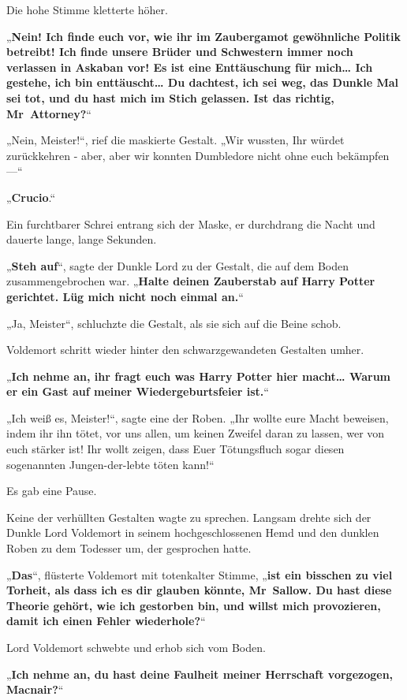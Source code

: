 {Die hohe Stimme kletterte höher.

„\textbf{Nein! Ich finde euch vor, wie ihr im Zaubergamot gewöhnliche Politik betreibt! Ich finde unsere Brüder und Schwestern immer noch verlassen in Askaban vor! Es ist eine Enttäuschung für mich… Ich gestehe, ich bin enttäuscht… Du dachtest, ich sei weg, das Dunkle Mal sei tot, und du hast mich im Stich gelassen. Ist das richtig, Mr~Attorney?}“

„Nein, Meister!“, rief die maskierte Gestalt. „Wir wussten, Ihr würdet zurückkehren - aber, aber wir konnten Dumbledore nicht ohne euch bekämpfen—“

„\textbf{Crucio}.“

Ein furchtbarer Schrei entrang sich der Maske, er durchdrang die Nacht und dauerte lange, lange Sekunden.

„\textbf{Steh auf}“, sagte der Dunkle Lord zu der Gestalt, die auf dem Boden zusammengebrochen war. „\textbf{Halte deinen Zauberstab auf Harry Potter gerichtet. Lüg mich nicht noch einmal an.}“

„Ja, Meister“, schluchzte die Gestalt, als sie sich auf die Beine schob.

Voldemort schritt wieder hinter den schwarzgewandeten Gestalten umher.

„\textbf{Ich nehme an, ihr fragt euch was Harry Potter hier macht… Warum er ein Gast auf meiner Wiedergeburtsfeier ist.}“

„Ich weiß es, Meister!“, sagte eine der Roben. „Ihr wollte eure Macht beweisen, indem ihr ihn tötet, vor uns allen, um keinen Zweifel daran zu lassen, wer von euch stärker ist! Ihr wollt zeigen, dass Euer Tötungsfluch sogar diesen sogenannten Jungen-der-lebte töten kann!“

Es gab eine Pause.

Keine der verhüllten Gestalten wagte zu sprechen. Langsam drehte sich der Dunkle Lord Voldemort in seinem hochgeschlossenen Hemd und den dunklen Roben zu dem Todesser um, der gesprochen hatte.

„\textbf{Das}“, flüsterte Voldemort mit totenkalter Stimme, „\textbf{ist ein bisschen zu viel Torheit, als dass ich es dir glauben könnte, Mr~Sallow. Du hast diese Theorie gehört, wie ich gestorben bin, und willst mich provozieren, damit ich einen Fehler wiederhole?}“

Lord Voldemort schwebte und erhob sich vom Boden.

„\textbf{Ich nehme an, du hast deine Faulheit meiner Herrschaft vorgezogen, Macnair?}“

}
